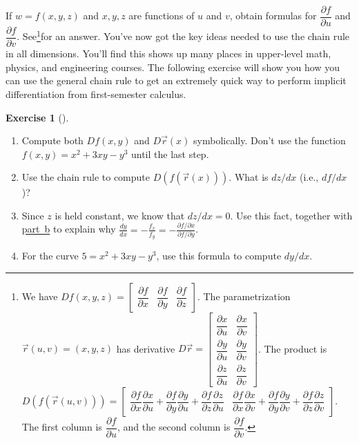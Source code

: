 \documentclass[10pt,]{book}
\theoremstyle{plain}
\theoremstyle{definition}
\theoremstyle{definition}
\theoremstyle{definition}
\theoremstyle{definition}
\newtheorem{exploration}[project]{Exercise}
\theoremstyle{definition}
\numberwithin{equation}{section}
\newcommand{\ds}{\displaystyle}
\newcommand{\amp}{&}
\begin{document}
If \(w=f(x,y,z)\) and \(x,y,z\) are functions of \(u\) and \(v\), obtain formulas for \(\dfrac{\partial f}{\partial u}\) and \(\dfrac{\partial f}{\partial v}\). See\footnote{We have \(Df(x,y,z)
=\begin{bmatrix}\dfrac{\partial f}{\partial x}\amp \dfrac{\partial f}{\partial y}\amp \dfrac{\partial f}{\partial z}
\end{bmatrix}\). The parametrization \(\vec r(u,v)=(x,y,z)\) has derivative \(D\vec r 
=\begin{bmatrix}\dfrac{\partial x}{\partial u}\amp \dfrac{\partial x}{\partial v}\\
\dfrac{\partial y}{\partial u}\amp \dfrac{\partial y}{\partial v}\\
\dfrac{\partial z}{\partial u}\amp \dfrac{\partial z}{\partial v}
\end{bmatrix}\). The product is \(D(f(\vec r(u,v)))
=\begin{bmatrix}\dfrac{\partial f}{\partial x}\dfrac{\partial x}{\partial u}+
\dfrac{\partial f}{\partial y}\dfrac{\partial y}{\partial u}+
\dfrac{\partial f}{\partial z}\dfrac{\partial z}{\partial u}\amp 
\dfrac{\partial f}{\partial x}\dfrac{\partial x}{\partial v}+
\dfrac{\partial f}{\partial y}\dfrac{\partial y}{\partial v}+
\dfrac{\partial f}{\partial z}\dfrac{\partial z}{\partial v}
\end{bmatrix}\). The first column is \(\dfrac{\partial f}{\partial u}\), and the second column is \(\dfrac{\partial f}{\partial v}\).\label{fn-5}}for an answer.%
You've now got the key ideas needed to use the chain rule in all dimensions. You'll find this shows up many places in upper-level math, physics, and engineering courses. The following exercise will show you how you can use the general chain rule to get an extremely quick way to perform implicit differentiation from first-semester calculus.%
\begin{exploration}[]\label{exploration-158}
\leavevmode%
\begin{enumerate}[font=\bfseries,label=(\alph*),ref=\alph*]
\item\label{task-369} Compute both \(Df(x,y)\) and \(D\vec r(x)\) symbolically.  Don't use the function \(f(x,y)=x^2+3xy-y^3\) until the last step.%
\item\label{item_4} Use the chain rule to compute \(D(f(\vec r(x)))\). What is \(dz/dx\) (i.e., \(df/dx\))?%
\item\label{task-371} Since \(z\) is held constant, we know that \(dz/dx=0\). Use this fact, together with \hyperref[item_4]{part~b} to explain why \(\ds \frac{dy}{dx} = -\frac{f_x}{f_y} = -\frac{\partial f/ \partial x}{\partial f/ \partial y}\).%
\item\label{task-372} For the curve \(5=x^2+3xy-y^3\), use this formula to compute \(dy/dx\).%
\end{enumerate}
\end{exploration}
\end{document}
